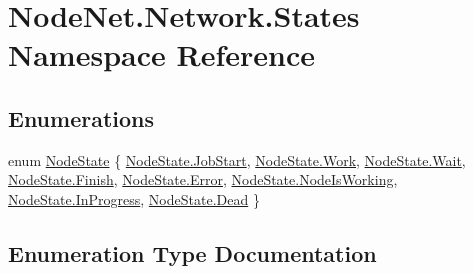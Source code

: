 \hypertarget{namespace_node_net_1_1_network_1_1_states}{}\section{Node\+Net.\+Network.\+States Namespace Reference}
\label{namespace_node_net_1_1_network_1_1_states}
\subsection*{Enumerations}
\begin{DoxyCompactItemize}
\item 
enum \hyperlink{namespace_node_net_1_1_network_1_1_states_a0c130cd0043f8c509dddba2cf1fd2f36}{Node\+State} \{ \newline
\hyperlink{namespace_node_net_1_1_network_1_1_states_a0c130cd0043f8c509dddba2cf1fd2f36a623ce5f57789979d02ba3241e79d3aec}{Node\+State.\+Job\+Start}, 
\hyperlink{namespace_node_net_1_1_network_1_1_states_a0c130cd0043f8c509dddba2cf1fd2f36a0f9263536b9fc61ada745644735bfd8f}{Node\+State.\+Work}, 
\hyperlink{namespace_node_net_1_1_network_1_1_states_a0c130cd0043f8c509dddba2cf1fd2f36a0f68101772bd5397ef8eb1b632798652}{Node\+State.\+Wait}, 
\hyperlink{namespace_node_net_1_1_network_1_1_states_a0c130cd0043f8c509dddba2cf1fd2f36aa20ddccbb6f808ec42cd66323e6c6061}{Node\+State.\+Finish}, 
\newline
\hyperlink{namespace_node_net_1_1_network_1_1_states_a0c130cd0043f8c509dddba2cf1fd2f36a902b0d55fddef6f8d651fe1035b7d4bd}{Node\+State.\+Error}, 
\hyperlink{namespace_node_net_1_1_network_1_1_states_a0c130cd0043f8c509dddba2cf1fd2f36ae3ef50109d21f84c4d0d3e273404b8bb}{Node\+State.\+Node\+Is\+Working}, 
\hyperlink{namespace_node_net_1_1_network_1_1_states_a0c130cd0043f8c509dddba2cf1fd2f36a12d868c18cb29bf58f02b504be9033fd}{Node\+State.\+In\+Progress}, 
\hyperlink{namespace_node_net_1_1_network_1_1_states_a0c130cd0043f8c509dddba2cf1fd2f36a183b62c7f067711f9c5a54913c054617}{Node\+State.\+Dead}
 \}
\end{DoxyCompactItemize}


\subsection{Enumeration Type Documentation}
\mbox{\label{namespace_node_net_1_1_network_1_1_states_a0c130cd0043f8c509dddba2cf1fd2f36}} 
